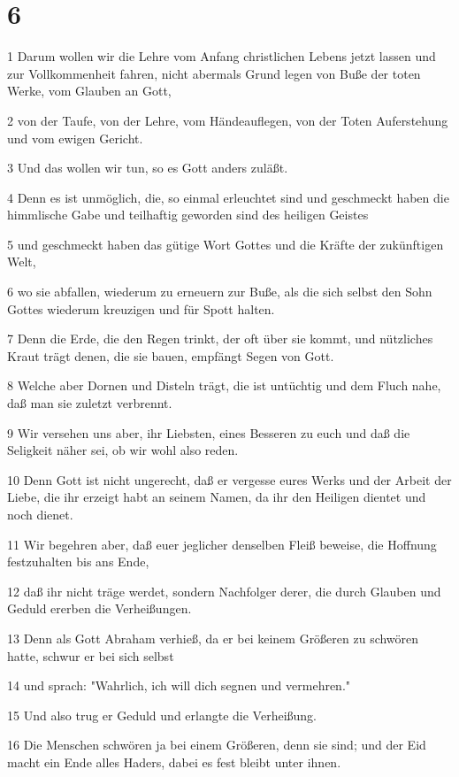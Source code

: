 \chapter{6}

\par 1 Darum wollen wir die Lehre vom Anfang christlichen Lebens jetzt lassen und zur Vollkommenheit fahren, nicht abermals Grund legen von Buße der toten Werke, vom Glauben an Gott,
\par 2 von der Taufe, von der Lehre, vom Händeauflegen, von der Toten Auferstehung und vom ewigen Gericht.
\par 3 Und das wollen wir tun, so es Gott anders zuläßt.
\par 4 Denn es ist unmöglich, die, so einmal erleuchtet sind und geschmeckt haben die himmlische Gabe und teilhaftig geworden sind des heiligen Geistes
\par 5 und geschmeckt haben das gütige Wort Gottes und die Kräfte der zukünftigen Welt,
\par 6 wo sie abfallen, wiederum zu erneuern zur Buße, als die sich selbst den Sohn Gottes wiederum kreuzigen und für Spott halten.
\par 7 Denn die Erde, die den Regen trinkt, der oft über sie kommt, und nützliches Kraut trägt denen, die sie bauen, empfängt Segen von Gott.
\par 8 Welche aber Dornen und Disteln trägt, die ist untüchtig und dem Fluch nahe, daß man sie zuletzt verbrennt.
\par 9 Wir versehen uns aber, ihr Liebsten, eines Besseren zu euch und daß die Seligkeit näher sei, ob wir wohl also reden.
\par 10 Denn Gott ist nicht ungerecht, daß er vergesse eures Werks und der Arbeit der Liebe, die ihr erzeigt habt an seinem Namen, da ihr den Heiligen dientet und noch dienet.
\par 11 Wir begehren aber, daß euer jeglicher denselben Fleiß beweise, die Hoffnung festzuhalten bis ans Ende,
\par 12 daß ihr nicht träge werdet, sondern Nachfolger derer, die durch Glauben und Geduld ererben die Verheißungen.
\par 13 Denn als Gott Abraham verhieß, da er bei keinem Größeren zu schwören hatte, schwur er bei sich selbst
\par 14 und sprach: "Wahrlich, ich will dich segnen und vermehren."
\par 15 Und also trug er Geduld und erlangte die Verheißung.
\par 16 Die Menschen schwören ja bei einem Größeren, denn sie sind; und der Eid macht ein Ende alles Haders, dabei es fest bleibt unter ihnen.
